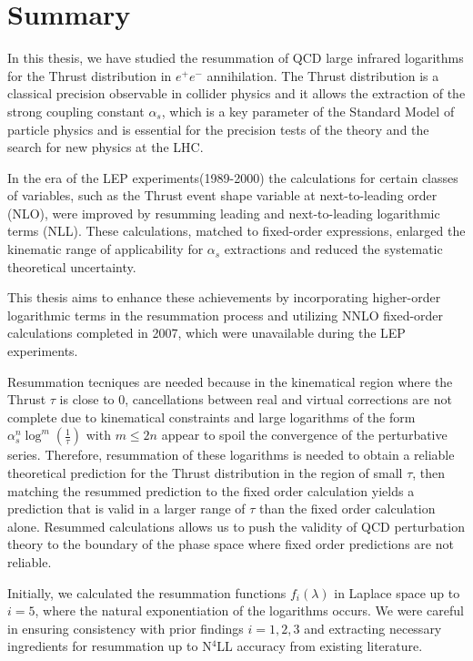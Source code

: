 \documentclass[10pt,english,openany]{book}
\begin{document}

\chapter*{Summary}

In this thesis, we have studied the resummation of QCD large infrared logarithms for the Thrust distribution in $e^+e^-$ annihilation.
The Thrust distribution is a classical precision observable in collider physics and it allows the extraction of the strong coupling constant $\alpha_s$,
which is a key parameter of the Standard Model of particle physics and is essential for the precision tests of the theory and the search for new physics at the LHC.

In the era of the LEP experiments(1989-2000) the calculations for certain classes of variables, such as the Thrust event shape variable at next-to-leading order (NLO), 
were improved by resumming leading and next-to-leading logarithmic terms (NLL). These calculations, matched to fixed-order expressions, enlarged the
kinematic range of applicability for $\alpha_s$ extractions and reduced the systematic theoretical uncertainty. 

This thesis aims to enhance these achievements by incorporating higher-order logarithmic terms in the resummation process and utilizing NNLO fixed-order calculations completed in 2007, 
which were unavailable during the LEP experiments.

Resummation tecniques are needed because in the kinematical region where the Thrust $\tau$ is close to 0, cancellations between real and virtual corrections 
are not complete due to kinematical constraints and large logarithms of the form $\alpha_s^n \log^m(\frac{1}{\tau})$ with $m \le 2n$ appear to spoil the convergence of the perturbative series.
Therefore, resummation of these logarithms is needed to obtain a reliable theoretical prediction for the Thrust distribution in the region of small $\tau$, 
then matching the resummed prediction to the fixed order calculation yields a prediction that is valid in a larger range of $\tau$ than the fixed order calculation alone.
Resummed calculations allows us to push the validity of QCD perturbation theory to the boundary of the phase space
where fixed order predictions are not reliable.

Initially, we calculated the resummation functions $f_i(\lambda)$ in Laplace space up to $i=5$, where the natural exponentiation of the logarithms occurs.
We were careful in ensuring consistency with prior findings $i=1,2,3$ and extracting necessary ingredients for resummation up to N$^4$LL accuracy from existing literature.
\end{document}
